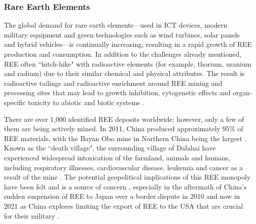 \documentclass{article}
\begin{document}
\subsubsection{Rare Earth Elements}
The global demand for rare earth elements---used in ICT devices, modern military equipment and green technologies such as wind turbines, solar panels and hybrid vehicles---is continually increasing, resulting in a rapid growth of REE production and consumption. In addition to the challenges already mentioned, REE often ``hitch-hike" with radioactive elements (for example, thorium, uranium and radium) due to their similar chemical and physical attributes. The result is radioactive tailings and radioactive enrichment around REE mining and processing sites \cite{huang2016protecting} that may lead to growth inhibition, cytogenetic effects and organ‐specific toxicity to abiotic and biotic systems \cite{pagano2015health, zhang2000chronic}.

There are over 1,000 identified REE deposits worldwide; however, only a few of them are being actively mined. In 2011, China produced approximately 95\% of REE materials, with the Bayan Obo mine in Northern China being the largest \cite{huang2016protecting}. Known as the ``death village", the surrounding village of Dalahai have experienced widespread intoxication of the farmland, animals and humans, including respiratory illnesses, cardiovascular disease, leukemia and cancer as a result of the mine \cite{huang2016protecting, eja2020bayanobo, dailymail2011bayanobo}. The potential geopolitical implications of this REE monopoly have been felt and is a source of concern \cite{gulley2018china, zhang2015did}, especially in the aftermath of China's sudden suspension of REE to Japan over a border dispute in 2010 \cite{ting2013rare} and now in 2021 as China explores limiting the export of REE to the USA that are crucial for their military \cite{financialtimes2021REE}.

\end{document}
